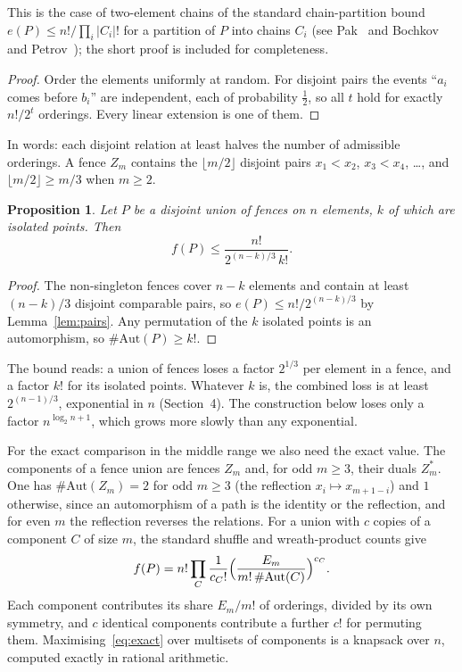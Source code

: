 \documentclass[11pt]{amsart}
\newtheorem{proposition}[lemma]{Proposition}
\theoremstyle{remark}
\begin{document}
This is the case of two-element chains of the standard chain-partition bound $e(P)\le n!/\prod_i|C_i|!$ for a partition of $P$ into chains $C_i$ (see Pak~\cite[\S4.2]{Pak} and Bochkov and Petrov~\cite{BP}); the short proof is included for completeness.

\begin{proof}
Order the elements uniformly at random. For disjoint pairs the events ``$a_i$ comes before $b_i$'' are independent, each of probability $\tfrac12$, so all $t$ hold for exactly $n!/2^t$ orderings. Every linear extension is one of them.
\end{proof}

In words: each disjoint relation at least halves the number of admissible orderings. A fence $Z_m$ contains the $\lfloor m/2\rfloor$ disjoint pairs $x_1<x_2$, $x_3<x_4$, \dots, and $\lfloor m/2\rfloor\ge m/3$ when $m\ge2$.

\begin{proposition}\label{prop:fence}
Let $P$ be a disjoint union of fences on $n$ elements, $k$ of which are isolated points. Then
\[
f(P)\le\frac{n!}{2^{(n-k)/3}\,k!} .
\]
\end{proposition}

\begin{proof}
The non-singleton fences cover $n-k$ elements and contain at least $(n-k)/3$ disjoint comparable pairs, so $e(P)\le n!/2^{(n-k)/3}$ by Lemma~\ref{lem:pairs}. Any permutation of the $k$ isolated points is an automorphism, so $\#\mathrm{Aut}(P)\ge k!$.
\end{proof}

The bound reads: a union of fences loses a factor $2^{1/3}$ per element in a fence, and a factor $k!$ for its isolated points. Whatever $k$ is, the combined loss is at least $2^{(n-1)/3}$, exponential in $n$ (Section~4). The construction below loses only a factor $n^{\log_2n+1}$, which grows more slowly than any exponential.

For the exact comparison in the middle range we also need the exact value. The components of a fence union are fences $Z_m$ and, for odd $m\ge3$, their duals $Z_m^*$. One has $\#\mathrm{Aut}(Z_m)=2$ for odd $m\ge3$ (the reflection $x_i\mapsto x_{m+1-i}$) and $1$ otherwise, since an automorphism of a path is the identity or the reflection, and for even $m$ the reflection reverses the relations. For a union with $c$ copies of a component $C$ of size $m$, the standard shuffle and wreath-product counts give
\begin{equation}\label{eq:exact}
f(P)=n!\prod_{C}\frac{1}{c_C!}\Bigl(\frac{E_m}{m!\,\#\mathrm{Aut}(C)}\Bigr)^{c_C}.
\end{equation}
Each component contributes its share $E_m/m!$ of orderings, divided by its own symmetry, and $c$ identical components contribute a further $c!$ for permuting them. Maximising~\eqref{eq:exact} over multisets of components is a knapsack over $n$, computed exactly in rational arithmetic.
\end{document}
